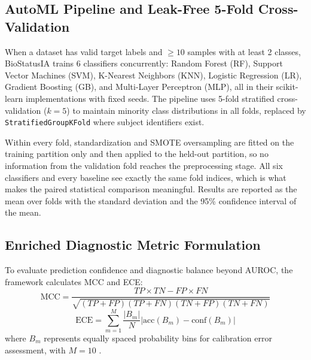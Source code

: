 \documentclass[conference]{IEEEtran}
\begin{document}
\subsection{AutoML Pipeline and Leak-Free 5-Fold Cross-Validation}
When a dataset has valid target labels and $\ge 10$ samples with at least 2 classes, BioStatusIA trains 6 classifiers concurrently: Random Forest (RF), Support Vector Machines (SVM), K-Nearest Neighbors (KNN), Logistic Regression (LR), Gradient Boosting (GB), and Multi-Layer Perceptron (MLP), all in their scikit-learn implementations \cite{scikit2011} with fixed seeds. The pipeline uses 5-fold stratified cross-validation ($k=5$) to maintain minority class distributions in all folds, replaced by \texttt{StratifiedGroupKFold} where subject identifiers exist.

Within every fold, standardization and SMOTE oversampling are fitted on the training partition only and then applied to the held-out partition, so no information from the validation fold reaches the preprocessing stage. All six classifiers and every baseline see exactly the same fold indices, which is what makes the paired statistical comparison meaningful. Results are reported as the mean over folds with the standard deviation and the 95\% confidence interval of the mean.

\subsection{Enriched Diagnostic Metric Formulation}
To evaluate prediction confidence and diagnostic balance beyond AUROC, the framework calculates MCC and ECE:
\begin{equation}
\text{MCC} = \frac{TP \times TN - FP \times FN}{\sqrt{(TP+FP)(TP+FN)(TN+FP)(TN+FN)}}
\end{equation}
\begin{equation}
\text{ECE} = \sum_{m=1}^{M} \frac{|B_m|}{N} \left|\text{acc}(B_m) - \text{conf}(B_m)\right|
\end{equation}
where $B_m$ represents equally spaced probability bins for calibration error assessment, with $M=10$ \cite{mcc1975, guo2017calibration}.
\end{document}
